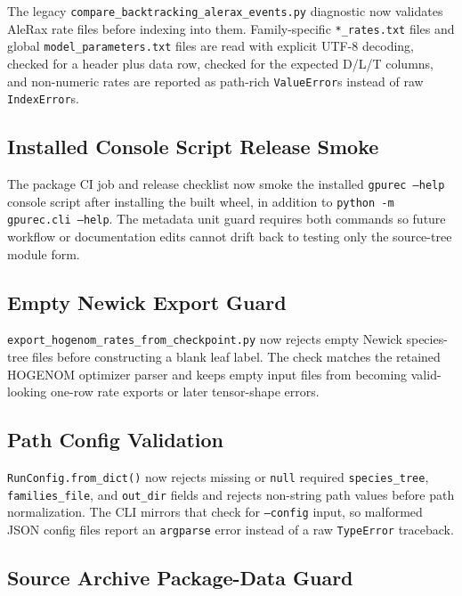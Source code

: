 \documentclass[11pt]{article}
\begin{document}
The legacy \texttt{compare\_backtracking\_alerax\_events.py} diagnostic now
validates AleRax rate files before indexing into them.  Family-specific
\texttt{*\_rates.txt} files and global \texttt{model\_parameters.txt} files are
read with explicit UTF-8 decoding, checked for a header plus data row, checked
for the expected D/L/T columns, and non-numeric rates are reported as
path-rich \texttt{ValueError}s instead of raw \texttt{IndexError}s.

\subsection{Installed Console Script Release Smoke}

The package CI job and release checklist now smoke the installed
\texttt{gpurec --help} console script after installing the built wheel, in
addition to \texttt{python -m gpurec.cli --help}.  The metadata unit guard
requires both commands so future workflow or documentation edits cannot drift
back to testing only the source-tree module form.

\subsection{Empty Newick Export Guard}

\texttt{export\_hogenom\_rates\_from\_checkpoint.py} now rejects empty Newick
species-tree files before constructing a blank leaf label.  The check matches
the retained HOGENOM optimizer parser and keeps empty input files from becoming
valid-looking one-row rate exports or later tensor-shape errors.

\subsection{Path Config Validation}

\texttt{RunConfig.from\_dict()} now rejects missing or \texttt{null} required
\texttt{species\_tree}, \texttt{families\_file}, and \texttt{out\_dir} fields
and rejects non-string path values before path normalization.  The CLI mirrors
that check for \texttt{--config} input, so malformed JSON config files report
an \texttt{argparse} error instead of a raw \texttt{TypeError} traceback.

\subsection{Source Archive Package-Data Guard}
\end{document}

